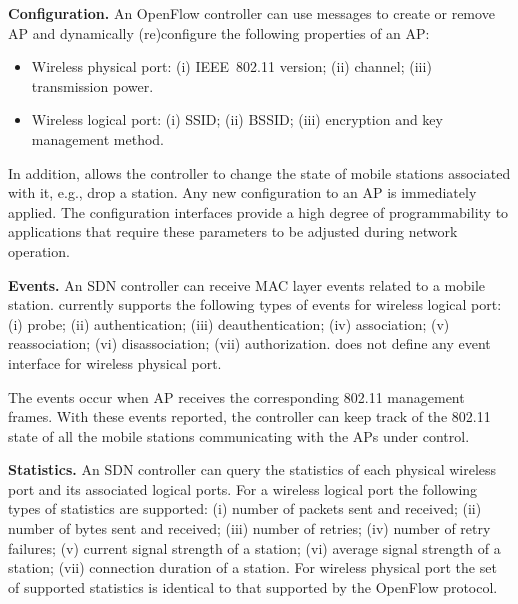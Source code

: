 \textbf{Configuration.}
An OpenFlow controller can use \aetherflow messages to create or remove AP and
dynamically 
(re)configure the following properties of an AP:
\begin{itemize}
  \item Wireless physical port: 
     (i) IEEE~802.11 version; 
    (ii) channel; 
    (iii) transmission power. 

  \item Wireless logical port: 
    (i) SSID; 
    (ii) BSSID; 
    (iii) encryption and key management method.
\end{itemize}

In addition, \aetherflow allows the controller to change the state of mobile
stations associated with it, e.g., drop a station. Any new configuration to an
AP is immediately applied. The configuration interfaces provide
a high degree of programmability to applications that require these parameters 
to be adjusted during network operation.

\textbf{Events.}
  An SDN controller can receive MAC layer events related to a mobile station. 
  \aetherflow currently supports the following types of
  events for wireless logical port:
      (i) probe; 
      (ii) authentication; 
      (iii) deauthentication; 
      (iv) association; 
      (v) reassociation; 
      (vi) disassociation; 
      (vii) authorization.
\aetherflow does not define any event interface for wireless physical port.

  The events occur when AP receives the corresponding 802.11 management frames.
  With these events reported, the controller can keep track of the 802.11 state
  of all the mobile stations communicating with the APs under control. 

\textbf{Statistics.}
  An SDN controller can query the statistics of each physical wireless
  port and its associated logical ports. For a wireless logical port the following types
  of statistics are supported: 
      (i) number of packets sent and received; 
      (ii) number of bytes sent and received; 
      (iii) number of retries;
      (iv) number of retry failures; 
      (v) current signal strength of a station; 
      (vi) average signal strength of a station; 
      (vii) connection duration of a station.
For wireless physical port the set of supported statistics is identical to that supported by the OpenFlow protocol. 
% 
% 


